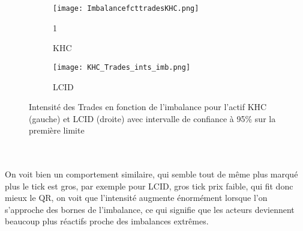 \documentclass[12pt,a4paper]{article}
\theoremstyle{definition}
\theoremstyle{remark}
\begin{document}
\begin{figure}[h!]
    \centering
    \begin{subfigure}[b]{0.48\textwidth}
        \centering
        \texttt{[image: ImbalancefcttradesKHC.png]}
        \caption{KHC}1
        \label{fig:imbalance}
    \end{subfigure}
    \hfill
    \begin{subfigure}[b]{0.48\textwidth}
        \centering
        \texttt{[image: KHC\_Trades\_ints\_imb.png]}
        \caption{LCID}
        \label{fig:densite_imbalance}
    \end{subfigure}
    \caption{Intensité des Trades en fonction de l'imbalance pour l'actif KHC (gauche) et LCID (droite) avec intervalle de confiance à 95\% sur la première limite}
    \label{fig:comparison}
\end{figure}
\\
\\
On voit bien un comportement similaire, qui semble tout de même plus marqué plus le tick est gros, par exemple pour LCID, gros tick prix faible, qui fit donc mieux le QR, on voit que l'intensité augmente énormément lorsque l'on s'approche des bornes de l'imbalance, ce qui signifie que les acteurs deviennent beaucoup plus réactifs proche des imbalances extrêmes.
\end{document}
